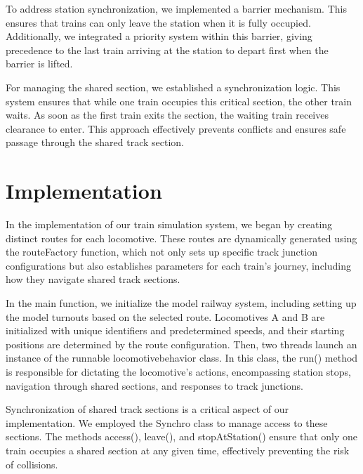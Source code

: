 \documentclass{article}
\begin{document}
    To address station synchronization, we implemented a barrier mechanism. This ensures that trains can only leave the station when it is fully occupied. Additionally, we integrated a priority system within this barrier, giving precedence to the last train arriving at the station to depart first when the barrier is lifted.

    For managing the shared section, we established a synchronization logic. This system ensures that while one train occupies this critical section, the other train waits. As soon as the first train exits the section, the waiting train receives clearance to enter. This approach effectively prevents conflicts and ensures safe passage through the shared track section.

    \newpage

    \section{Implementation}

    In the implementation of our train simulation system, we began by creating distinct routes for each locomotive. These routes are dynamically generated using the routeFactory function, which not only sets up specific track junction configurations but also establishes parameters for each train's journey, including how they navigate shared track sections.

    In the main function, we initialize the model railway system, including setting up the model turnouts based on the selected route. Locomotives A and B are initialized with unique identifiers and predetermined speeds, and their starting positions are determined by the route configuration. Then, two threads launch an instance of the runnable locomotivebehavior class. In this class, the run() method is responsible for dictating the locomotive's actions, encompassing station stops, navigation through shared sections, and responses to track junctions.

    Synchronization of shared track sections is a critical aspect of our implementation. We employed the Synchro class to manage access to these sections. The methods access(), leave(), and stopAtStation() ensure that only one train occupies a shared section at any given time, effectively preventing the risk of collisions.
\end{document}
